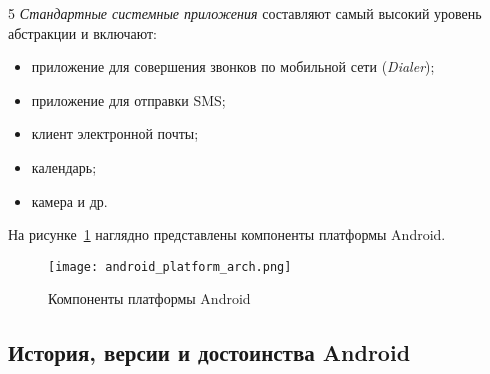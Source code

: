 5 \textit{Стандартные системные приложения} составляют самый высокий уровень абстракции и включают:
\begin{itemize}
	\item приложение для совершения звонков по мобильной сети (\textit{Dialer});
	\item приложение для отправки SMS;
	\item клиент электронной почты;
	\item календарь;
	\item камера и др.
\end{itemize}

На рисунке~\ref{fig:android_platform_arch} наглядно представлены компоненты платформы Android.

\begin{figure}[p]
    \centering
    \texttt{[image: android\_platform\_arch.png]}  
    \caption{Компоненты платформы Android}
	\label{fig:android_platform_arch}
\end{figure}

\subsection{История, версии и достоинства Android}
\label{sub:android_platform:history_and_pros}


